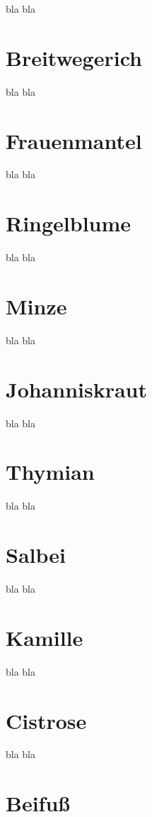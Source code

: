bla bla

\section{Breitwegerich}

bla bla

\section{Frauenmantel}

bla bla

\section{Ringelblume}

bla bla

\section{Minze}

bla bla

\section{Johanniskraut}

bla bla

\section{Thymian}

bla bla

\section{Salbei}

bla bla

\section{Kamille}

bla bla

\section{Cistrose}

bla bla

\section{Beifuß}

